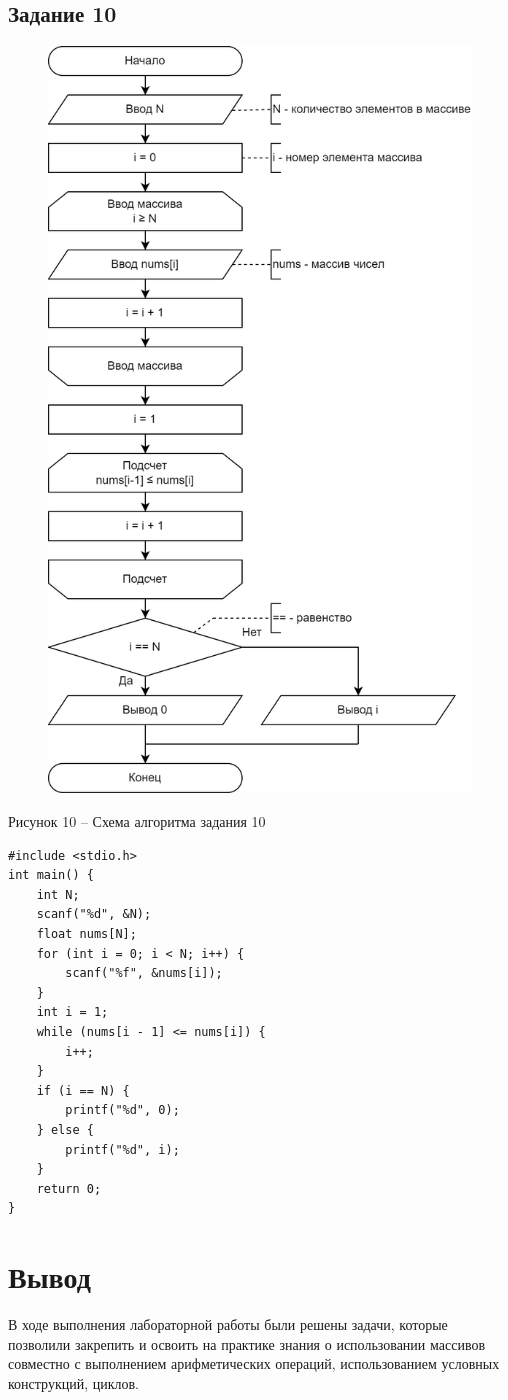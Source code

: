 \documentclass[a4paper,14pt]{extarticle}
\begin{document}
	\subsection*{Задание 10}
	\begin{figure}[h]
		\centering
		\includegraphics[width=0.6\linewidth]{schemes/s-10}
	\end{figure}
	\begin{center}
		Рисунок 10 – Схема алгоритма задания 10
	\end{center}
	\begin{lstlisting}[tabsize=2,basicstyle=\ttfamily]
#include <stdio.h>
int main() {
	int N;
	scanf("%d", &N);
	float nums[N];
	for (int i = 0; i < N; i++) {
		scanf("%f", &nums[i]);
	}
	int i = 1;
	while (nums[i - 1] <= nums[i]) {
		i++;
	}
	if (i == N) {
		printf("%d", 0);
	} else {
		printf("%d", i);
	}
	return 0;
}
	\end{lstlisting}
	
	\section*{Вывод}
	В ходе выполнения лабораторной работы были решены задачи, которые позволили закрепить и освоить на практике знания о использовании массивов совместно с выполнением арифметических операций, использованием условных конструкций, циклов.
	
\end{document}
